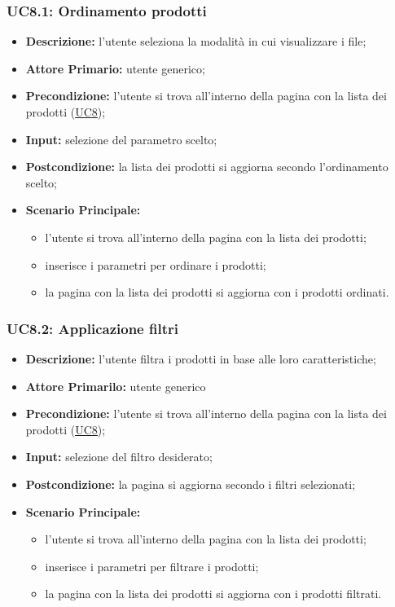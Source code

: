 \subsubsection{UC8.1: Ordinamento prodotti}
\label{sec:UC8.1}
\begin{itemize}
    \item \textbf{Descrizione:} l'utente seleziona la modalità in cui visualizzare i file;
    \item \textbf{Attore Primario:} utente generico;
    \item \textbf{Precondizione:} l'utente si trova all'interno della pagina con la lista dei prodotti (\hyperref[sec:UC8]{\underline{UC8}});
    \item \textbf{Input:} selezione del parametro scelto;
    \item \textbf{Postcondizione:} la lista dei prodotti si aggiorna secondo l'ordinamento scelto;
    \item \textbf{Scenario Principale:}
          \begin{itemize}
              \item l'utente si trova all'interno della pagina con la lista dei prodotti;
              \item inserisce i parametri per ordinare i prodotti;
              \item la pagina con la lista dei prodotti si aggiorna con i prodotti ordinati.
          \end{itemize}
\end{itemize}
\subsubsection{UC8.2: Applicazione filtri}
\label{sec:UC8.2}
\begin{itemize}
    \item \textbf{Descrizione:} l'utente filtra i prodotti in base alle loro caratteristiche;
    \item \textbf{Attore Primarilo:} utente generico
    \item \textbf{Precondizione:} l'utente si trova all'interno della pagina con la lista dei prodotti (\hyperref[sec:UC8]{\underline{UC8}});
    \item \textbf{Input:} selezione del filtro desiderato;
    \item \textbf{Postcondizione:} la pagina si aggiorna secondo i filtri selezionati;
    \item \textbf{Scenario Principale:}
          \begin{itemize}
              \item l'utente si trova all'interno della pagina con la lista dei prodotti;
              \item inserisce i parametri per filtrare i prodotti;
              \item la pagina con la lista dei prodotti si aggiorna con i prodotti filtrati.
          \end{itemize}
\end{itemize}